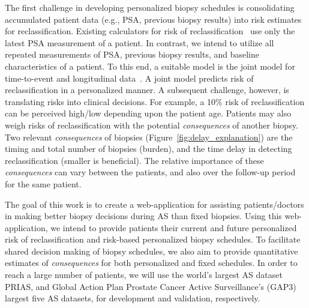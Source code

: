 The first challenge in developing personalized biopsy schedules is consolidating accumulated patient data (e.g., PSA, previous biopsy results) into risk estimates for reclassification. Existing calculators for risk of reclassification~\citep{partin1993use,makarov2007updated} use only the latest PSA measurement of a patient. In contrast, we intend to utilize all repeated measurements of PSA, previous biopsy results, and baseline characteristics of a patient. To this end, a suitable model is the joint model for time-to-event and longitudinal data~\citep{tomer2019, coley2017prediction,rizopoulos2012joint}. A joint model predicts risk of reclassification in a personalized manner. A subsequent challenge, however, is translating risks into clinical decisions. For example, a 10\% risk of reclassification can be perceived high/low depending upon the patient age. Patients may also weigh risks of reclassification with the potential \textit{consequences} of another biopsy. Two relevant \textit{consequences} of biopsies (Figure~\ref{fig:delay_explanation}) are the timing and total number of biopsies (burden), and the time delay in detecting reclassification (smaller is beneficial). The relative importance of these \textit{consequences} can vary between the patients, and also over the follow-up period for the same patient.

The goal of this work is to create a web-application for assisting patients/doctors in making better biopsy decisions during AS than fixed biopsies. Using this web-application, we intend to provide patients their current and future personalized risk of reclassification and risk-based personalized biopsy schedules. To facilitate shared decision making of biopsy schedules, we also aim to provide quantitative estimates of \textit{consequences} for both personalized and fixed schedules. In order to reach a large number of patients, we will use the world's largest AS dataset PRIAS, and Global Action Plan Prostate Cancer Active Surveillance's (GAP3) largest five AS datasets, for development and validation, respectively.